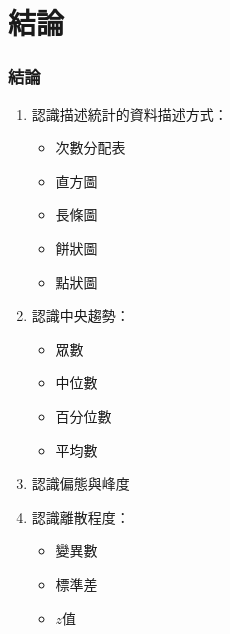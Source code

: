 \documentclass{beamer}
\begin{document}
\section{結論}
\begin{frame}\frametitle{結論}
\begin{enumerate}
\item 認識描述統計的資料描述方式：
\begin{itemize}
\item 次數分配表
\item 直方圖
\item 長條圖
\item 餅狀圖
\item 點狀圖
\end{itemize}
\item 認識中央趨勢：
\begin{itemize}
\item 眾數
\item 中位數
\item 百分位數
\item 平均數
\end{itemize}
\item 認識偏態與峰度
\item 認識離散程度：
\begin{itemize}
\item 變異數
\item 標準差
\item $z$值
\end{itemize}
\end{enumerate}
\end{frame}
\end{document}

